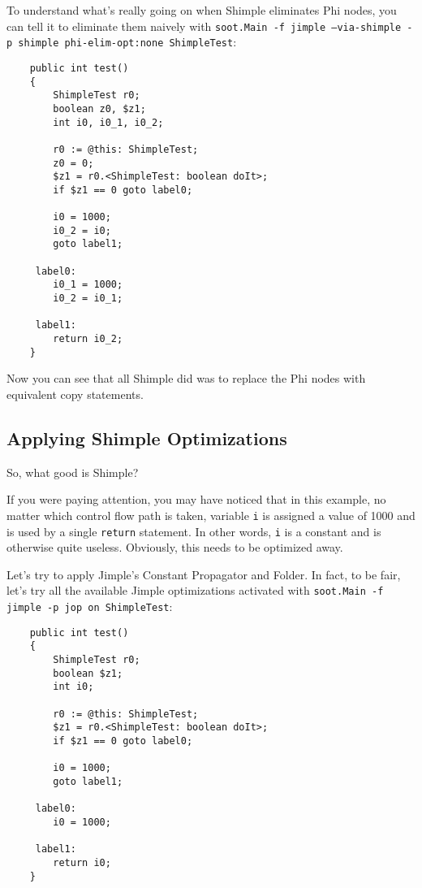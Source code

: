 \documentclass[10pt,letterpaper,oneside,onecolumn]{article}
\begin{document}
To understand what's really going on when Shimple eliminates Phi
nodes, you can tell it to eliminate them naively with {\tt soot.Main
-f jimple --via-shimple -p shimple phi-elim-opt:none ShimpleTest}:

\begin{verbatim}
    public int test()
    {
        ShimpleTest r0;
        boolean z0, $z1;
        int i0, i0_1, i0_2;

        r0 := @this: ShimpleTest;
        z0 = 0;
        $z1 = r0.<ShimpleTest: boolean doIt>;
        if $z1 == 0 goto label0;

        i0 = 1000;
        i0_2 = i0;
        goto label1;

     label0:
        i0_1 = 1000;
        i0_2 = i0_1;

     label1:
        return i0_2;
    }
\end{verbatim}

Now you can see that all Shimple did was to replace the Phi nodes
with equivalent copy statements.

\subsection{Applying Shimple Optimizations}

So, what good is Shimple?  

If you were paying attention, you may have noticed that in this
example, no matter which control flow path is taken, variable {\tt i}
is assigned a value of 1000 and is used by a single {\tt return}
statement.  In other words, {\tt i} is a constant and is otherwise
quite useless.  Obviously, this needs to be optimized away.

Let's try to apply Jimple's Constant Propagator and Folder.  In fact,
to be fair, let's try all the available  Jimple optimizations activated
with {\tt soot.Main -f jimple -p jop on ShimpleTest}:

\begin{verbatim}
    public int test()
    {
        ShimpleTest r0;
        boolean $z1;
        int i0;

        r0 := @this: ShimpleTest;
        $z1 = r0.<ShimpleTest: boolean doIt>;
        if $z1 == 0 goto label0;

        i0 = 1000;
        goto label1;

     label0:
        i0 = 1000;

     label1:
        return i0;
    }
\end{verbatim}
\end{document}
